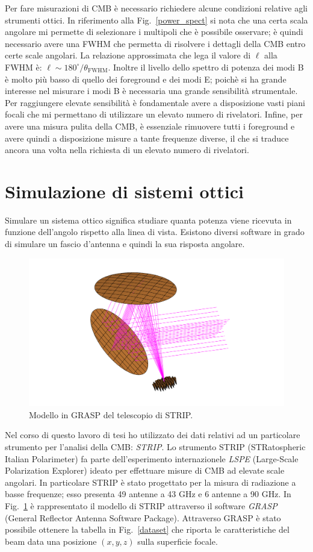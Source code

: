\documentclass[12pt,a4paper,final]{book}
\begin{document}
Per fare misurazioni di CMB è necessario richiedere alcune condizioni relative agli strumenti ottici. In riferimento alla Fig.~\ref{power_spect} si nota che una certa scala angolare mi permette di selezionare i multipoli che è possibile osservare; è quindi necessario avere una FWHM che permetta di risolvere i dettagli della CMB entro certe scale angolari. La relazione approssimata che lega il valore di $\ell$ alla FWHM è: $\ell\sim{180^{\circ}}/{\theta_\text{FWHM}}$.
Inoltre il livello dello spettro di potenza dei modi B è molto più basso di quello dei foreground e dei modi E; poichè si ha grande interesse nel misurare i modi B è necessaria una grande sensibilità strumentale. Per raggiungere elevate sensibilità è fondamentale avere a disposizione vasti piani focali che mi permettano di utilizzare un elevato numero di rivelatori.
Infine, per avere una misura pulita della CMB, è essenziale rimuovere tutti i foreground e avere quindi a disposizione misure a tante frequenze diverse, il che si traduce ancora una volta nella richiesta di un elevato numero di rivelatori.




\section{Simulazione di sistemi ottici}\label{simulazioni}
Simulare un sistema ottico significa studiare quanta potenza viene ricevuta in funzione dell'angolo rispetto alla linea di vista. 
Esistono diversi software in grado di simulare un fascio d'antenna e quindi la sua risposta angolare.

\begin{figure}[!ht]
	\centering
	\includegraphics[width=0.6\linewidth]{../figures/strip.png}
	\caption{Modello in GRASP del telescopio di STRIP.}
	\label{strip}
\end{figure}

Nel corso di questo lavoro di tesi ho utilizzato dei dati relativi ad un particolare strumento per l'analisi della CMB: \textit{STRIP}.
Lo strumento STRIP (STRatospheric Italian Polarimeter) fa parte dell'esperimento internazionele \textit{LSPE} (Large-Scale Polarization Explorer) ideato per effettuare misure di CMB ad elevate scale angolari.
In particolare STRIP è stato progettato per la misura di radiazione a basse frequenze; esso presenta 49 antenne a 43 GHz e 6 antenne a 90 GHz. In Fig.~\ref{strip} è rappresentato il modello di STRIP attraverso il software \textit{GRASP} (General Reflector Antenna Software Package).
Attraverso GRASP è stato possibile ottenere la tabella in Fig.~\ref{dataset} che riporta le caratteristiche del beam data una posizione $(x, y, z)$ sulla superficie focale.
\end{document}
